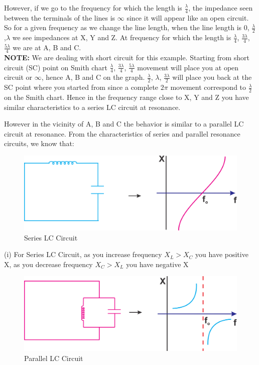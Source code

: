 However, if we go to the frequency for which the length is $ \frac{\lambda}{4} $, the impedance seen between the terminals of the lines is $\infty$ since it will appear like an open circuit.
So for a given frequency as we change the line length, when the line length is 0, $ \frac{\lambda}{2} $,$ \lambda $ we see impedances at X, Y and Z. At frequency for which the length is $ \frac{\lambda}{4} $, $ \frac{3\lambda}{4} $, $ \frac{5\lambda}{4} $ we are at A, B and C.\\ 
\textbf{NOTE:} We are dealing with short circuit for this example. Starting from short circuit (SC) point on Smith chart $ \frac{\lambda}{4} $, $ \frac{3\lambda}{4} $, $ \frac{5\lambda}{4} $ movement will place you at open circuit or $ \infty $,  hence A, B and C on the graph. $ \frac{\lambda}{2} $, $ \lambda $, $ \frac{3\lambda}{2} $ will place you back at the SC point where you  started from since a complete $ 2\pi $ movement correspond to $ \frac{\lambda}{2} $ on the Smith chart. Hence in the frequency range close to X,
Y and Z you have similar characteristics to a series LC circuit
at resonance.

However in the vicinity of A, B and C the behavior is similar to a parallel LC circuit at resonance. From the characteristics of series and parallel resonance circuits, we know that:
\begin{figure}[h]
\centering
\includegraphics[width=1\linewidth]{./graphics/group10diagram11}
\caption{Series LC Circuit}
\end{figure}

(i) For Series LC Circuit, as you increase frequency $ X_{L} > X_{C} $ you have positive X, as you decrease frequency $ X_{C} > X_{L} $ you have negative X
\begin{figure}[h]
\centering
\includegraphics[width=1\linewidth]{./graphics/group10diagram12}
\caption{Parallel LC Circuit}
\end{figure}

